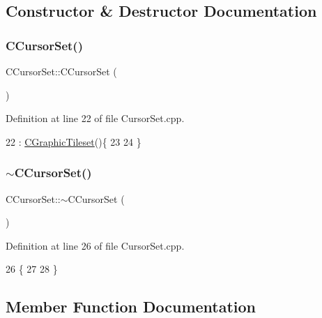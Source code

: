 \subsection{Constructor \& Destructor Documentation}
\hypertarget{classCCursorSet_af7040d50fde2f260b3d95c42312b1cc9}{}\label{classCCursorSet_af7040d50fde2f260b3d95c42312b1cc9} 
\subsubsection{\texorpdfstring{C\+Cursor\+Set()}{CCursorSet()}}
{\footnotesize\ttfamily C\+Cursor\+Set\+::\+C\+Cursor\+Set (\begin{DoxyParamCaption}{ }\end{DoxyParamCaption})}



Definition at line 22 of file Cursor\+Set.\+cpp.


\begin{DoxyCode}
22                        : \hyperlink{classCGraphicTileset_a871889683273be71a94c73776fcd507b}{CGraphicTileset}()\{
23     
24 \}
\end{DoxyCode}
\hypertarget{classCCursorSet_ae8783829a637263e44fc6dff799c5e0e}{}\label{classCCursorSet_ae8783829a637263e44fc6dff799c5e0e} 
\subsubsection{\texorpdfstring{$\sim$\+C\+Cursor\+Set()}{~CCursorSet()}}
{\footnotesize\ttfamily C\+Cursor\+Set\+::$\sim$\+C\+Cursor\+Set (\begin{DoxyParamCaption}{ }\end{DoxyParamCaption})\hspace{0.3cm}{\ttfamily [virtual]}}



Definition at line 26 of file Cursor\+Set.\+cpp.


\begin{DoxyCode}
26                        \{
27     
28 \}
\end{DoxyCode}


\subsection{Member Function Documentation}
\hypertarget{classCCursorSet_ad42c2ad37c03f39fa4b84aa362b337e6}{}\label{classCCursorSet_ad42c2ad37c03f39fa4b84aa362b337e6} 
